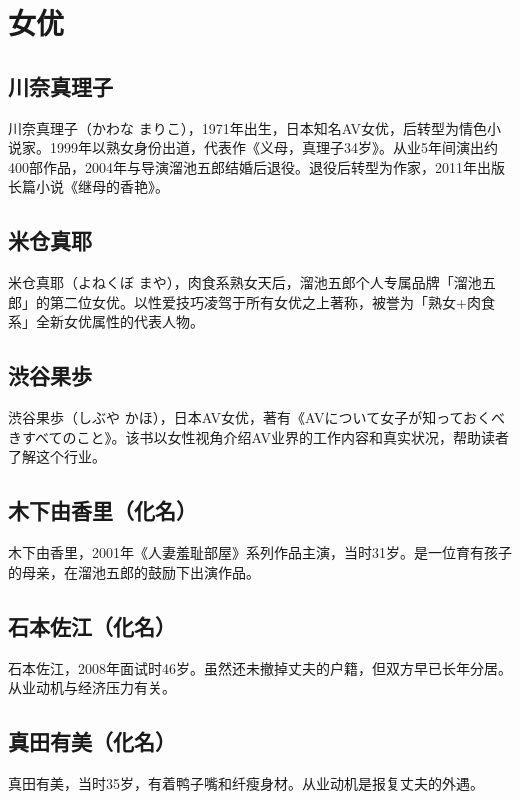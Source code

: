 \documentclass[12pt,UTF8]{ctexbook}
\begin{document}
\section{女优}

\subsection{川奈真理子}

川奈真理子（かわな まりこ），1971年出生，日本知名AV女优，后转型为情色小说家。1999年以熟女身份出道，代表作《义母，真理子34岁》。从业5年间演出约400部作品，2004年与导演溜池五郎结婚后退役。退役后转型为作家，2011年出版长篇小说《继母的香艳》。

\subsection{米仓真耶}

米仓真耶（よねくぼ まや），肉食系熟女天后，溜池五郎个人专属品牌「溜池五郎」的第二位女优。以性爱技巧凌驾于所有女优之上著称，被誉为「熟女+肉食系」全新女优属性的代表人物。

\subsection{渋谷果歩}

渋谷果歩（しぶや かほ），日本AV女优，著有《AVについて女子が知っておくべきすべてのこと》。该书以女性视角介绍AV业界的工作内容和真实状况，帮助读者了解这个行业。

\subsection{木下由香里（化名）}

木下由香里，2001年《人妻羞耻部屋》系列作品主演，当时31岁。是一位育有孩子的母亲，在溜池五郎的鼓励下出演作品。

\subsection{石本佐江（化名）}

石本佐江，2008年面试时46岁。虽然还未撤掉丈夫的户籍，但双方早已长年分居。从业动机与经济压力有关。

\subsection{真田有美（化名）}

真田有美，当时35岁，有着鸭子嘴和纤瘦身材。从业动机是报复丈夫的外遇。
\end{document}
